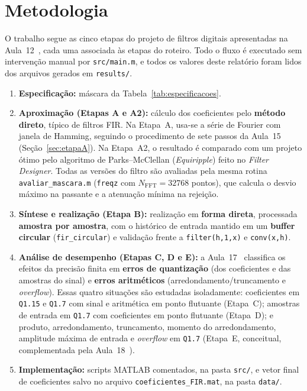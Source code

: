 \documentclass[11pt,a4paper]{article}
\begin{document}
\section{Metodologia}

O trabalho segue as cinco etapas do projeto de filtros digitais apresentadas na Aula~12~\cite{aula12}, cada uma associada às etapas do roteiro. Todo o fluxo é executado sem intervenção manual por \texttt{src/main.m}, e todos os valores deste relatório foram lidos dos arquivos gerados em \texttt{results/}.

\begin{enumerate}[leftmargin=1.6em, itemsep=2pt, topsep=3pt]
    \item \textbf{Especificação:} máscara da Tabela~\ref{tab:especificacoes}.

    \item \textbf{Aproximação (Etapas A e A2):} cálculo dos coeficientes pelo \textbf{método direto}, típico de filtros FIR. Na Etapa~A, usa-se a série de Fourier com janela de Hamming, seguindo o procedimento de sete passos da Aula~15~\cite{aula15} (Seção~\ref{sec:etapaA}). Na Etapa~A2, o resultado é comparado com um projeto ótimo pelo algoritmo de Parks--McClellan (\textit{Equiripple}) feito no \textit{Filter Designer}. Todas as versões do filtro são avaliadas pela mesma rotina \texttt{avaliar\_mascara.m} (\texttt{freqz} com $N_{\text{FFT}} = \num{32768}$ pontos), que calcula o desvio máximo na passante e a atenuação mínima na rejeição.

    \item \textbf{Síntese e realização (Etapa B):} realização em \textbf{forma direta}, processada \textbf{amostra por amostra}, com o histórico de entrada mantido em um \textbf{buffer circular} (\texttt{fir\_circular}) e validação frente a \texttt{filter(h,1,x)} e \texttt{conv(x,h)}.

    \item \textbf{Análise de desempenho (Etapas C, D e E):} a Aula~17~\cite{aula17} classifica os efeitos da precisão finita em \textbf{erros de quantização} (dos coeficientes e das amostras do sinal) e \textbf{erros aritméticos} (arredondamento/truncamento e \textit{overflow}). Essas quatro situações são estudadas isoladamente: coeficientes em \texttt{Q1.15} e \texttt{Q1.7} com sinal e aritmética em ponto flutuante (Etapa~C); amostras de entrada em \texttt{Q1.7} com coeficientes em ponto flutuante (Etapa~D); e produto, arredondamento, truncamento, momento do arredondamento, amplitude máxima de entrada e \textit{overflow} em \texttt{Q1.7} (Etapa~E, conceitual, complementada pela Aula~18~\cite{aula18}).

    \item \textbf{Implementação:} scripts MATLAB comentados, na pasta \texttt{src/}, e vetor final de coeficientes salvo no arquivo \texttt{coeficientes\_FIR.mat}, na pasta \texttt{data/}.
\end{enumerate}
\end{document}
